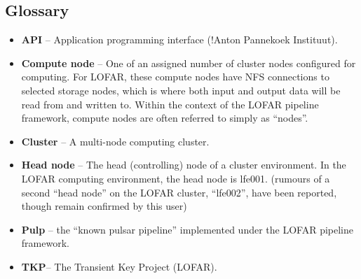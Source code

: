 \documentclass[a4paper,10pt,bibtotoc]{scrartcl}
\begin{document}
\subsection{Glossary}
\begin{itemize}
\item \textbf{API} -- Application programming interface (!Anton Pannekoek Instituut).
\item \textbf{Compute node} -- One of an assigned number of cluster nodes 
configured for computing.  For LOFAR, these compute nodes have NFS connections 
to selected storage nodes, which is where both input and output data will be 
read from  and written to.  Within the context of the LOFAR pipeline framework, compute nodes
are often referred to simply as ``nodes''.
\item \textbf{Cluster} -- A multi-node computing cluster.
\item \textbf{Head node} -- The head (controlling) node of a cluster environment. In the LOFAR 
computing environment, the head node is lfe001.  (rumours of a second
``head node'' on the LOFAR cluster, ``lfe002'', have been reported,
though remain confirmed by this user)
\item \textbf{Pulp} -- the ``known pulsar pipeline'' implemented under
  the LOFAR pipeline framework.
\item \textbf{TKP}-- The Transient Key Project (LOFAR).
\end{itemize}
\end{document}
